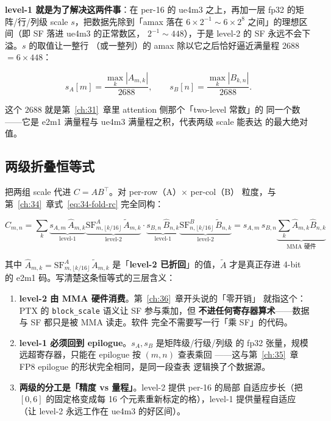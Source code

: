 \textbf{level-1 就是为了解决这两件事}：在 per-16 的 ue4m3 之上，再加一层
fp32 的矩阵/行/列级 scale $s$，把数据先除到「amax 落在 $6\times 2^{-1}
\sim 6\times 2^{8}$ 之间」的理想区间（即 SF 落进 ue4m3 的正常数区，
$2^{-1}\sim 448$），于是 level-2 的 SF 永远不会下溢。$s$ 的取值让一整行
（或一整列）的 amax 除以它之后恰好逼近满量程 2688 $= 6 \times 448$：

\begin{equation}
  s_A[m] = \frac{\max_k |A_{m,k}|}{2688},\qquad
  s_B[n] = \frac{\max_k |B_{k,n}|}{2688}.
  \label{eq:36-level1}
\end{equation}

这个 $2688$ 就是第~\ref{ch:31}~章里 attention 侧那个「two-level 常数」的
同一个数——它是 e2m1 满量程与 ue4m3 满量程之积，代表两级 scale 能表达
的最大绝对值。

\subsection{两级折叠恒等式}

把两组 scale 代进 $C = A B^{\top}$。对 per-row（A）$\times$ per-col（B）
粒度，与第~\ref{ch:34}~章式~\ref{eq:34-fold-rc} 完全同构：

\begin{equation}
  C_{m,n} = \sum_k \underbrace{s_{A,m}\,\hat{A}_{m,k}}_{\text{level-1}}
                 \underbrace{\mathrm{SF}^A_{m,\lfloor k/16\rfloor}
                           \,\tilde{A}_{m,k}}_{\text{level-2}}
                 \cdot
                 \underbrace{s_{B,n}\,\hat{B}_{n,k}}_{\text{level-1}}
                 \underbrace{\mathrm{SF}^B_{n,\lfloor k/16\rfloor}
                           \,\tilde{B}_{n,k}}_{\text{level-2}}
          = s_{A,m}\,s_{B,n}
            \underbrace{\sum_{k}\hat{A}_{m,k}\hat{B}_{n,k}}_{\text{MMA 硬件}}
  \label{eq:36-fold}
\end{equation}

其中 $\hat{A}_{m,k} = \mathrm{SF}^A_{m,\lfloor k/16\rfloor}\,\tilde{A}_{m,k}$
是「\textbf{level-2 已折回}」的值，$\tilde{A}$ 才是真正存进 4-bit 的 e2m1
码。写清楚这条恒等式的三层含义：

\begin{enumerate}[itemsep=2pt,topsep=3pt]
  \item \textbf{level-2 由 MMA 硬件消费}。第~\ref{ch:36}~章开头说的「零开销」
        就指这个：PTX 的 \texttt{block\_scale} 语义让 SF 参与乘加，但
        \textbf{不进任何寄存器算术}——数据与 SF 都只是被 MMA 读走。软件
        完全不需要写一行「乘 SF」的代码。
  \item \textbf{level-1 必须回到 epilogue}。$s_A,s_B$ 是矩阵级/行级/列级
        的 fp32 张量，规模远超寄存器，只能在 epilogue 按 $(m,n)$ 查表乘回
        ——这与第~\ref{ch:35}~章 FP8 epilogue 的形状完全相同，是同一段查表
        逻辑换了个数据源。
  \item \textbf{两级的分工是「精度 vs 量程」}。level-2 提供 per-16 的局部
        自适应步长（把 $[0,6]$ 的固定格变成每 16 个元素重新标定的格），level-1
        提供量程自适应（让 level-2 永远工作在 ue4m3 的好区间）。
\end{enumerate}

